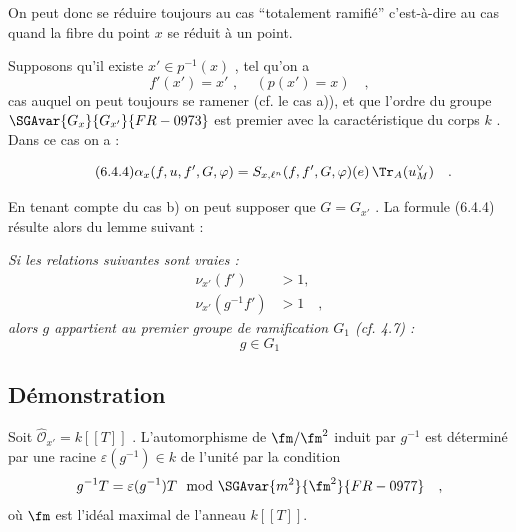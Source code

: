 On peut donc se réduire toujours au cas ``totalement ramifié'' c'est-à-dire au cas quand la fibre du point $x$ se réduit à un point.

 Supposons qu'il existe $x' \in p^{-1}(x)$ , tel qu'on a
\[
f'(x') = x' \text{ , } \quad (p(x') = x) \quad ,
\]
cas auquel on peut toujours se ramener (cf. le cas a)), et que l'ordre du groupe $\SGAvar{G_x}{G_{x'}}{FR-0973}$ est premier avec la caractéristique du corps $k$ . Dans ce cas on a :

\begin{equation}\tag{6.4.4}
\alpha_x(f,u, f', G, \varphi) = S_{x,\ell^n}(f, f', G, \varphi)(e) \, \Tr_A(u_M^\vee) \quad .
\end{equation}

En tenant compte du cas b) on peut supposer que $G = G_{x'}$ . La formule (6.4.4) résulte alors du lemme suivant :

\emph{Si les relations suivantes sont vraies :}
\begin{align*}
\nu_{x'}(f') &> 1 \text{,} \\
\nu_{x'}(g^{-1}f') &> 1 \quad ,
\end{align*}
\emph{alors $g$ appartient au premier groupe de ramification $G_1$ (cf. 4.7) :}
\[
g \in G_1
\]

\subsection*{Démonstration}
Soit $\widehat{\mathcal{O}}_{x'} = k[[T]]$ . L'automorphisme de $\fm/\fm^2$ induit par $g^{-1}$ est déterminé par une racine $\varepsilon(g^{-1}) \in k$ de l'unité par la condition
\[
g^{-1}T = \varepsilon(g^{-1})T \mod \SGAvar{m^2}{\fm^2}{FR-0977} \quad ,
\]
où $\fm$ est l'idéal maximal de l'anneau $k[[T]]$.


